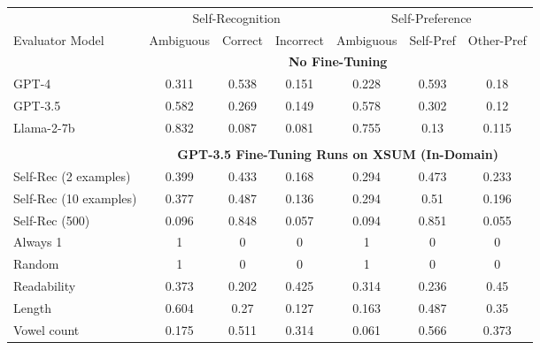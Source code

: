 \begin{table}[h]
    \centering
    \begin{tabular}{l|cccccc}
                                           & \multicolumn{3}{c}{Self-Recognition} & \multicolumn{3}{c}{Self-Preference}\\ 
        Evaluator Model                    & Ambiguous & Correct & Incorrect & Ambiguous & Self-Pref & Other-Pref \\
        \hline
        & \multicolumn{6}{c}{\textbf{No Fine-Tuning}} \\
        GPT-4                              & 0.311       & 0.538     & 0.151        & 0.228       & 0.593     & 0.18        \\
        GPT-3.5                            & 0.582       & 0.269     & 0.149        & 0.578       & 0.302     & 0.12        \\
        Llama-2-7b                         & 0.832       & 0.087     & 0.081        & 0.755       & 0.13      & 0.115       \\
        \multicolumn{7}{c}{} \\
        \multicolumn{1}{c}{} & \multicolumn{6}{c}{\textbf{GPT-3.5 Fine-Tuning Runs on XSUM (In-Domain)}} \\
        Self-Rec (2 examples)              & 0.399       & 0.433     & 0.168        & 0.294       & 0.473     & 0.233       \\
        Self-Rec (10 examples)             & 0.377       & 0.487     & 0.136        & 0.294       & 0.51      & 0.196       \\
        Self-Rec (500)                     & 0.096       & 0.848     & 0.057        & 0.094       & 0.851     & 0.055       \\
        Always 1                           & 1           & 0         & 0            & 1           & 0         & 0           \\
        Random                             & 1           & 0         & 0            & 1           & 0         & 0           \\
        Readability                        & 0.373       & 0.202     & 0.425        & 0.314       & 0.236     & 0.45        \\
        Length                             & 0.604       & 0.27      & 0.127        & 0.163       & 0.487     & 0.35        \\
        Vowel count                        & 0.175       & 0.511     & 0.314        & 0.061       & 0.566     & 0.373       \\

\end{tabular}
\end{table}

